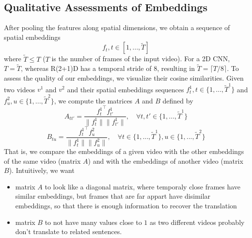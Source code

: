 \documentclass[final]{cvpr}
\begin{document}
\subsection{Qualitative Assessments of Embeddings}
After pooling the features along spatial dimensions, we obtain a sequence of spatial embeddings
$$f_t, t\in[1, ..., \tilde{T}]$$
where $\tilde{T}\leq T$ ($T$ is the number of frames of the input video). For a 2D CNN, $T=\tilde{T}$, whereas R(2+1)D has a temporal stride of $8$, resulting in $\tilde{T} = \lceil T/8 \rceil$.
To assess the quality of our embeddings, we visualize their cosine similarities. Given two videos $v^1$ and $v^2$ and their spatial embeddings sequences $f_t^1, t\in\{1, ..., \tilde{T}^1\}$ and $f_u^2, u\in \{1, ...,  \tilde{T}^2\}$, we compute the matrices $A$ and $B$ defined by
$$A_{tt'} = \frac{{f_t^1}^\intercal f_{t'}^1}{\lVert f_t^1 \rVert \lVert f_{t'}^1 \rVert}, \quad\forall t, t' \in\{1, ..., \tilde{T}^1\}$$
$$B_{tu} = \frac{{f_t^1}^\intercal f_u^2}{\lVert f_t^1 \rVert \lVert f_u^2 \rVert}, \quad \forall t \in\{1, ..., \tilde{T}^1\}, u \in\{1, ..., \tilde{T}^2\}$$
That is, we compare the embeddings of a given video with the other embeddings of the same video (matrix $A$) and with the embeddings of another video (matrix $B$). Intuitively, we want 
\begin{itemize}
	\item matrix $A$ to look like a diagonal matrix, where temporaly close frames have similar embeddings, but frames that are far appart have disimilar embeddings, so that there is enough information to recover the translation
	\item matrix $B$ to not have many values close to $1$ as two different videos probably don't translate to related sentences.
\end{itemize}
\end{document}
